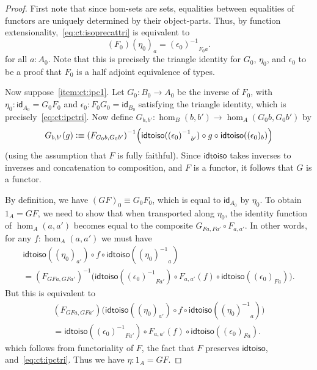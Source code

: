 \documentclass[10pt,a4paper]{article}
\newcommand{\jdeq}{\equiv}      %
\newcommand{\defeq}{\vcentcolon\equiv}  %
\newcommand{\opp}[1]{\mathord{{#1}^{-1}}}
\newcommand{\map}[2]{\ensuremath{{#1}\mathopen{}\left({#2}\right)\mathclose{}}\xspace}
\newcommand{\idfunc}[1][]{\ensuremath{\mathsf{id}_{#1}}\xspace}
\newcommand{\inv}[1]{{#1}^{-1}}
\newcommand{\idtoiso}{\ensuremath{\mathsf{idtoiso}}\xspace}
\theoremstyle{definition}
\theoremstyle{remark}
\numberwithin{equation}{section}
\begin{document}
\begin{proof}
  First note that since hom-sets are sets, equalities between equalities of functors are uniquely determined by their object-parts.
  Thus, by function extensionality,~\eqref{eq:ct:isoprecattri} is equivalent to
  \begin{equation}
    \map{(F_0)}{\eta_0}_a = \opp{(\epsilon_0)}_{F_0 a}.\label{eq:ct:ipctri}
  \end{equation}
  for all $a:A_0$.
  Note that this is precisely the triangle identity for $G_0$, $\eta_0$, and $\epsilon_0$ to be a proof that $F_0$ is a half adjoint equivalence of types.

  Now suppose~\ref{item:ct:ipc1}.
  Let $G_0:B_0 \to A_0$ be the inverse of $F_0$, with $\eta_0: \idfunc[A_0] = G_0 F_0$ and $\epsilon_0:F_0G_0 = \idfunc[B_0]$ satisfying the triangle identity, which is precisely~\eqref{eq:ct:ipctri}.
  Now define $G_{b,b'}:\hom_B(b,b') \to \hom_A(G_0b,G_0b')$ by
  \[ G_{b,b'}(g) \defeq
  \inv{(F_{G_0b,G_0b'})}\Big(\idtoiso(\opp{(\epsilon_0)}_{b'}) \circ g \circ \idtoiso((\epsilon_0)_b)\Big)
  \]
  (using the assumption that $F$ is fully faithful).
  Since \idtoiso takes inverses to inverses and concatenation to composition, and $F$ is a functor, it follows that $G$ is a functor.

  By definition, we have $(GF)_0 \jdeq G_0 F_0$, which is equal to $\idfunc[A_0]$ by $\eta_0$.
  To obtain $1_A = GF$, we need to show that when transported along $\eta_0$, the identity function of $\hom_A(a,a')$ becomes equal to the composite $G_{Fa,Fa'} \circ F_{a,a'}$.
  In other words, for any $f:\hom_A(a,a')$ we must have
  \begin{multline*}
    \idtoiso((\eta_0)_{a'}) \circ f \circ \idtoiso(\opp{(\eta_0)}_a)\\
    = \inv{(F_{GFa,GFa'})}\Big(\idtoiso(\opp{(\epsilon_0)}_{Fa'})
    \circ F_{a,a'}(f) \circ \idtoiso((\epsilon_0)_{Fa})\Big).
  \end{multline*}
  But this is equivalent to
  \begin{multline*}
    (F_{GFa,GFa'})\Big(\idtoiso((\eta_0)_{a'}) \circ f \circ \idtoiso(\opp{(\eta_0)}_a)\Big)\\
    = \idtoiso(\opp{(\epsilon_0)}_{Fa'})
    \circ F_{a,a'}(f) \circ \idtoiso((\epsilon_0)_{Fa}).
  \end{multline*}
  which follows from functoriality of $F$, the fact that $F$ preserves \idtoiso, and~\eqref{eq:ct:ipctri}.
  Thus we have $\eta:1_A = GF$.


\end{proof}
\end{document}
